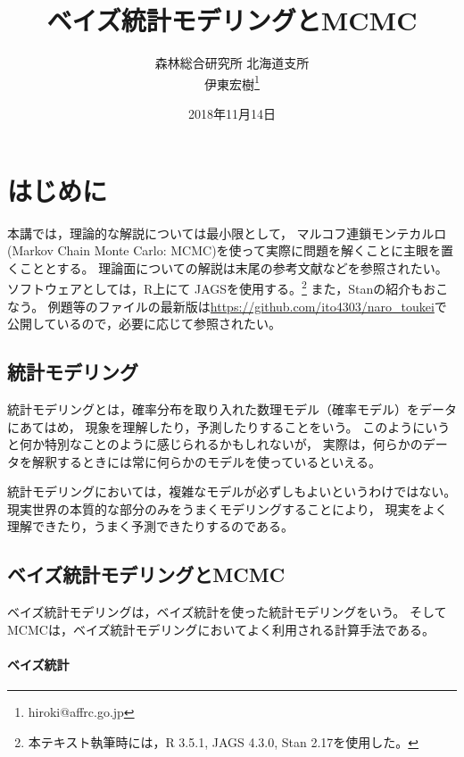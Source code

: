 \documentclass[11pt,uplatex]{jsarticle}
\begin{document}
\title{ベイズ統計モデリングとMCMC}
\author{森林総合研究所 北海道支所\\伊東宏樹\footnote{hiroki@affrc.go.jp}}
\date{2018年11月14日}
\maketitle


\section{はじめに}

本講では，理論的な解説については最小限として，
マルコフ連鎖モンテカルロ(Markov Chain Monte Carlo: MCMC)を使って実際に問題を解くことに主眼を置くこととする。
理論面についての解説は末尾の参考文献などを参照されたい。
ソフトウェアとしては，\textsf{R}\cite{R}上にて
\textsf{JAGS}\cite{JAGS}を使用する。\footnote{本テキスト執筆時には，R 3.5.1, JAGS 4.3.0, Stan 2.17を使用した。}
また，\textsf{Stan}\cite{Stan}の紹介もおこなう。
例題等のファイルの最新版は\url{https://github.com/ito4303/naro_toukei}で
公開しているので，必要に応じて参照されたい。

\subsection{統計モデリング}

統計モデリングとは，確率分布を取り入れた数理モデル（確率モデル）をデータにあてはめ，
現象を理解したり，予測したりすることをいう\cite{Matsuura}。
このようにいうと何か特別なことのように感じられるかもしれないが，
実際は，何らかのデータを解釈するときには常に何らかのモデルを使っているといえる\cite{BPA}。

統計モデリングにおいては，複雑なモデルが必ずしもよいというわけではない。
現実世界の本質的な部分のみをうまくモデリングすることにより，
現実をよく理解できたり，うまく予測できたりするのである\cite{BPA}。

\subsection{ベイズ統計モデリングとMCMC}

ベイズ統計モデリングは，ベイズ統計を使った統計モデリングをいう。
そしてMCMCは，ベイズ統計モデリングにおいてよく利用される計算手法である。

\paragraph{ベイズ統計}
\end{document}
